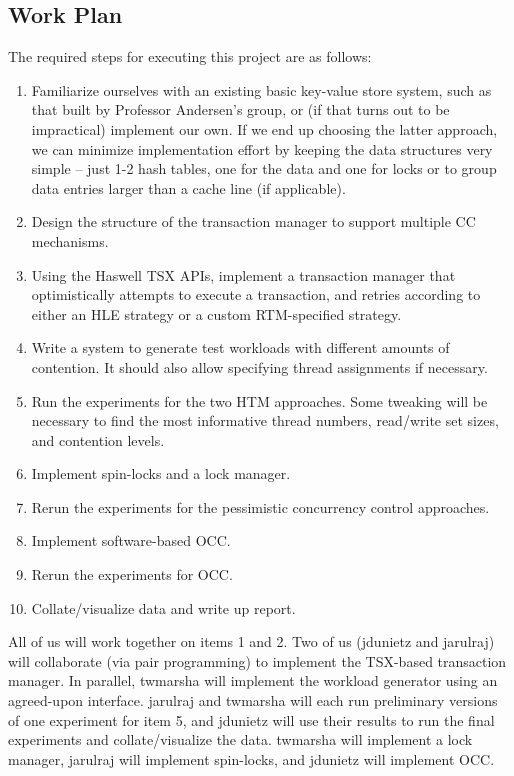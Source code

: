 \subsection{Work Plan}
The required steps for executing this project are as follows:
\begin{enumerate}
\item Familiarize ourselves with an existing basic key-value store system, such as that built by Professor Andersen's group, or (if that turns out to be impractical) implement our own. If we end up choosing the latter approach, we can minimize implementation effort by keeping the data structures very simple -- just 1-2 hash tables, one for the data and one for locks or to group data entries larger than a cache line (if applicable).
\item Design the structure of the transaction manager to support multiple CC mechanisms.
\item Using the Haswell TSX APIs, implement a transaction manager that optimistically attempts to execute a transaction, and retries according to either an HLE strategy or a custom RTM-specified strategy.
\item Write a system to generate test workloads with different amounts of contention. It should also allow specifying thread assignments if necessary.
\item Run the experiments for the two HTM approaches. Some tweaking will be necessary to find the most informative thread numbers, read/write set sizes, and contention levels.
\item Implement spin-locks and a lock manager.
\item Rerun the experiments for the pessimistic concurrency control approaches.
\item Implement software-based OCC.
\item Rerun the experiments for OCC.
\item Collate/visualize data and write up report.
\end{enumerate}

All of us will work together on items 1 and 2. Two of us (jdunietz and jarulraj) will collaborate (via pair programming) to implement the TSX-based transaction manager. In parallel, twmarsha will implement the workload generator using an agreed-upon interface. jarulraj and twmarsha will each run preliminary versions of one experiment for item 5, and jdunietz will use their results to run the final experiments and collate/visualize the data. twmarsha will implement a lock manager, jarulraj will implement spin-locks, and jdunietz will implement OCC.